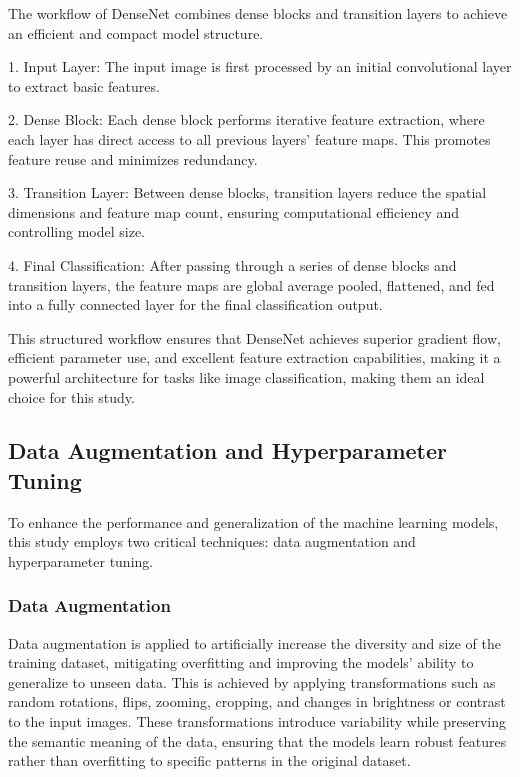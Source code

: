 The workflow of DenseNet combines dense blocks and transition layers to achieve an efficient and compact model structure. 

1. Input Layer: The input image is first processed by an initial convolutional layer to extract basic features.

2. Dense Block: Each dense block performs iterative feature extraction, where each layer has direct access to all previous layers' feature maps. This promotes feature reuse and minimizes redundancy.

3. Transition Layer: Between dense blocks, transition layers reduce the spatial dimensions and feature map count, ensuring computational efficiency and controlling model size.

4. Final Classification: After passing through a series of dense blocks and transition layers, the feature maps are global average pooled, flattened, and fed into a fully connected layer for the final classification output.

This structured workflow ensures that DenseNet achieves superior gradient flow, efficient parameter use, and excellent feature extraction capabilities, making it a powerful architecture for tasks like image classification, making them an ideal choice for this study.


\subsection{Data Augmentation and Hyperparameter Tuning}

To enhance the performance and generalization of the machine learning models, this study employs two critical techniques: data augmentation and hyperparameter tuning.

\subsubsection{Data Augmentation}
Data augmentation is applied to artificially increase the diversity and size of the training dataset, mitigating overfitting and improving the models' ability to generalize to unseen data. This is achieved by applying transformations such as random rotations, flips, zooming, cropping, and changes in brightness or contrast to the input images. These transformations introduce variability while preserving the semantic meaning of the data, ensuring that the models learn robust features rather than overfitting to specific patterns in the original dataset.

